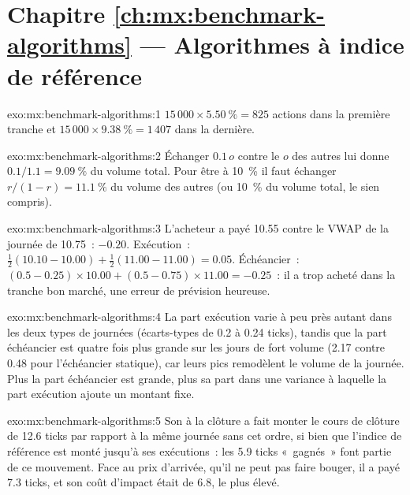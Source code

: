 \section*{Chapitre \ref{ch:mx:benchmark-algorithms} --- Algorithmes à indice de référence}

\begin{solution}{exo:mx:benchmark-algorithms:1}
$15\,000\times5.50~\%=825$ actions dans la première tranche et $15\,000\times9.38~\%=1\,407$ dans la dernière.
\end{solution}

\begin{solution}{exo:mx:benchmark-algorithms:2}
Échanger $0.1\,o$ contre le $o$ des autres lui donne $0.1/1.1=9.09~\%$ du volume total. Pour être à 10~\% il faut échanger $r/(1-r)=11.1~\%$ du volume des autres
(ou 10~\% du volume total, le sien compris).
\end{solution}

\begin{solution}{exo:mx:benchmark-algorithms:3}
L'acheteur a payé 10.55 contre le VWAP de la journée de 10.75~: $-0.20$. Exécution~: $\tfrac12(10.10-10.00)+\tfrac12(11.00-11.00)=0.05$. Échéancier~:
$(0.5-0.25)\times10.00+(0.5-0.75)\times11.00=-0.25$~: il a trop acheté dans la tranche bon marché, une erreur de prévision heureuse.
\end{solution}

\begin{solution}{exo:mx:benchmark-algorithms:4}
La part exécution varie à peu près autant dans les deux types de journées (écarts-types de 0.2 à 0.24 ticks), tandis que la part échéancier est quatre fois plus grande
sur les jours de fort volume (2.17 contre 0.48 pour l'échéancier statique), car leurs pics remodèlent le volume de la journée. Plus la part échéancier est grande, plus
sa part dans une variance à laquelle la part exécution ajoute un montant fixe.
\end{solution}

\begin{solution}{exo:mx:benchmark-algorithms:5}
Son  à la clôture a fait monter le cours de clôture de 12.6 ticks par rapport à la même journée sans cet ordre, si bien que l'indice de référence est monté jusqu'à ses exécutions~: les 5.9
ticks «~gagnés~» font partie de ce mouvement. Face au prix d'arrivée, qu'il ne peut pas faire bouger, il a payé 7.3 ticks, et son coût d'impact était de 6.8, le plus élevé.
\end{solution}

